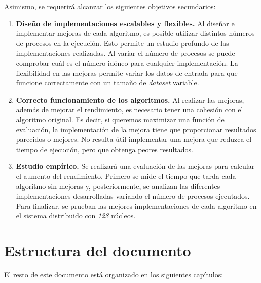 	Asimismo, se requerirá alcanzar los siguientes objetivos secundarios:
	
	\begin{enumerate}
		\item \textbf{Diseño de implementaciones escalables y flexibles.} Al diseñar e implementar mejoras de cada algoritmo, es posible utilizar distintos números de procesos en la ejecución. Esto permite un estudio profundo de las implementaciones realizadas. Al variar el número de procesos se puede comprobar cuál es el número idóneo para cualquier implementación. La flexibilidad en las mejoras permite variar los datos de entrada para que funcione correctamente con un tamaño de \textit{dataset} variable.
		\item \textbf{Correcto funcionamiento de los algoritmos.} Al realizar las mejoras, además de mejorar el rendimiento, es necesario tener una cohesión con el algoritmo original. Es decir, si queremos maximizar una función de evaluación, la implementación de la mejora tiene que proporcionar resultados parecidos o mejores. No resulta útil implementar una mejora que reduzca el tiempo de ejecución, pero que obtenga peores resultados.
		\item \textbf{Estudio empírico.} Se realizará una evaluación de las mejoras para calcular el aumento del rendimiento. Primero se mide el tiempo que tarda cada algoritmo sin mejoras y, posteriormente, se analizan las diferentes implementaciones desarrolladas variando el número de procesos ejecutados. Para finalizar, se prueban las mejores implementaciones de cada algoritmo en el sistema distribuido con \textit{128} núcleos.
	\end{enumerate}





\section{Estructura del documento}
	El resto de este documento está organizado en los siguientes capítulos:
	
